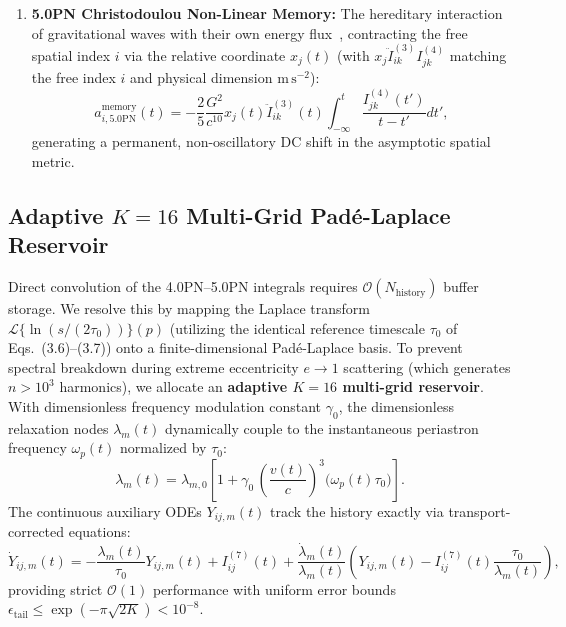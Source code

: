 \documentclass[11pt,a4paper,reqno]{article}
\theoremstyle{plain}
\theoremstyle{definition}
\theoremstyle{remark}
\numberwithin{equation}{section}
\begin{document}
\begin{enumerate}
    \begin{equation}
    a_{i, 4.5\mathrm{PN}}^{\mathrm{tail-tail}}(t) = -\frac{4 G^3 M^2}{5 c^{11}} x_j(t) \int_0^\infty \ln^2\left( \frac{s}{2 \tau_0} \right) I_{ij}^{(8)}(t - s) \, ds.
    \end{equation}
    \item \textbf{5.0PN Christodoulou Non-Linear Memory:} The hereditary interaction of gravitational waves with their own energy flux~\cite{Christodoulou1991,Blanchet2014}, contracting the free spatial index $i$ via the relative coordinate $x_j(t)$ (with $x_j \ddot{I}_{ik}^{(3)} I_{jk}^{(4)}$ matching the free index $i$ and physical dimension $\mathrm{m}\,\mathrm{s}^{-2}$):
    \begin{equation}
    a_{i, 5.0\mathrm{PN}}^{\mathrm{memory}}(t) = -\frac{2}{5} \frac{G^2}{c^{10}} x_j(t) \ddot{I}_{ik}^{(3)}(t) \int_{-\infty}^{t} \frac{I_{jk}^{(4)}(t')}{t - t'} dt',
    \end{equation}
    generating a permanent, non-oscillatory DC shift in the asymptotic spatial metric.
\end{enumerate}

\subsection{Adaptive \texorpdfstring{$K=16$}{K=16} Multi-Grid Padé-Laplace Reservoir}
Direct convolution of the 4.0PN--5.0PN integrals requires $\mathcal{O}(N_{\mathrm{history}})$ buffer storage. We resolve this by mapping the Laplace transform $\mathcal{L}\{\ln(s/(2\tau_0))\}(p)$ (utilizing the identical reference timescale $\tau_0$ of Eqs.~(3.6)--(3.7)) onto a finite-dimensional Padé-Laplace basis. To prevent spectral breakdown during extreme eccentricity $e \to 1$ scattering (which generates $n > 10^3$ harmonics), we allocate an \textbf{adaptive $K=16$ multi-grid reservoir}. With dimensionless frequency modulation constant $\gamma_0$, the dimensionless relaxation nodes $\lambda_m(t)$ dynamically couple to the instantaneous periastron frequency $\omega_p(t)$ normalized by $\tau_0$:
\begin{equation}
\lambda_m(t) = \lambda_{m, 0} \left[ 1 + \gamma_0 \, \left(\frac{v(t)}{c}\right)^3 \big(\omega_p(t) \tau_0\big) \right].
\end{equation}
The continuous auxiliary ODEs $Y_{ij, m}(t)$ track the history exactly via transport-corrected equations:
\begin{equation}
\dot{Y}_{ij, m}(t) = -\frac{\lambda_m(t)}{\tau_0} Y_{ij, m}(t) + I_{ij}^{(7)}(t) + \frac{\dot{\lambda}_m(t)}{\lambda_m(t)} \left( Y_{ij, m}(t) - I_{ij}^{(7)}(t) \frac{\tau_0}{\lambda_m(t)} \right),
\end{equation}
providing strict $\mathcal{O}(1)$ performance with uniform error bounds $\epsilon_{\mathrm{tail}} \le \exp(-\pi\sqrt{2K}) < 10^{-8}$.
\end{document}
